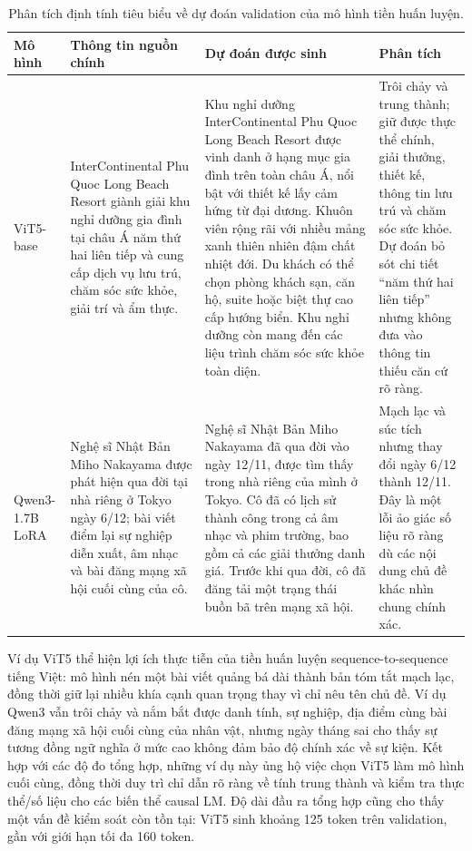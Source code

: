 \documentclass[conference]{IEEEtran}
\begin{document}
\begin{table}[htbp]
\centering
\caption{Phân tích định tính tiêu biểu về dự đoán validation của mô hình tiền huấn luyện.}
\label{tab:qualitative_pretrained}
\begin{tabular}{p{}p{}p{}p{}}
\toprule
Mô hình & Thông tin nguồn chính & Dự đoán được sinh & Phân tích \\
\midrule
ViT5-base &
InterContinental Phu Quoc Long Beach Resort giành giải khu nghỉ dưỡng gia đình tại châu Á năm thứ hai liên tiếp và cung cấp dịch vụ lưu trú, chăm sóc sức khỏe, giải trí và ẩm thực. &
Khu nghỉ dưỡng InterContinental Phu Quoc Long Beach Resort được vinh danh ở hạng mục gia đình trên toàn châu Á, nổi bật với thiết kế lấy cảm hứng từ đại dương. Khuôn viên rộng rãi với nhiều mảng xanh thiên nhiên đậm chất nhiệt đới. Du khách có thể chọn phòng khách sạn, căn hộ, suite hoặc biệt thự cao cấp hướng biển. Khu nghỉ dưỡng còn mang đến các liệu trình chăm sóc sức khỏe toàn diện. &
Trôi chảy và trung thành; giữ được thực thể chính, giải thưởng, thiết kế, thông tin lưu trú và chăm sóc sức khỏe. Dự đoán bỏ sót chi tiết ``năm thứ hai liên tiếp'' nhưng không đưa vào thông tin thiếu căn cứ rõ ràng. \\
\midrule
Qwen3-1.7B LoRA &
Nghệ sĩ Nhật Bản Miho Nakayama được phát hiện qua đời tại nhà riêng ở Tokyo ngày 6/12; bài viết điểm lại sự nghiệp diễn xuất, âm nhạc và bài đăng mạng xã hội cuối cùng của cô. &
Nghệ sĩ Nhật Bản Miho Nakayama đã qua đời vào ngày 12/11, được tìm thấy trong nhà riêng của mình ở Tokyo. Cô đã có lịch sử thành công trong cả âm nhạc và phim trường, bao gồm cả các giải thưởng danh giá. Trước khi qua đời, cô đã đăng tải một trạng thái buồn bã trên mạng xã hội. &
Mạch lạc và súc tích nhưng thay đổi ngày 6/12 thành 12/11. Đây là một lỗi ảo giác số liệu rõ ràng dù các nội dung chủ đề khác nhìn chung chính xác. \\
\bottomrule
\end{tabular}
\end{table}

Ví dụ ViT5 thể hiện lợi ích thực tiễn của tiền huấn luyện sequence-to-sequence tiếng Việt: mô hình nén một bài viết quảng bá dài thành bản tóm tắt mạch lạc, đồng thời giữ lại nhiều khía cạnh quan trọng thay vì chỉ nêu tên chủ đề. Ví dụ Qwen3 vẫn trôi chảy và nắm bắt được danh tính, sự nghiệp, địa điểm cùng bài đăng mạng xã hội cuối cùng của nhân vật, nhưng ngày tháng sai cho thấy sự tương đồng ngữ nghĩa ở mức cao không đảm bảo độ chính xác về sự kiện. Kết hợp với các độ đo tổng hợp, những ví dụ này ủng hộ việc chọn ViT5 làm mô hình cuối cùng, đồng thời duy trì chỉ dẫn rõ ràng về tính trung thành và kiểm tra thực thể/số liệu cho các biến thể causal LM. Độ dài đầu ra tổng hợp cũng cho thấy một vấn đề kiểm soát còn tồn tại: ViT5 sinh khoảng 125 token trên validation, gần với giới hạn tối đa 160 token.
\end{document}

